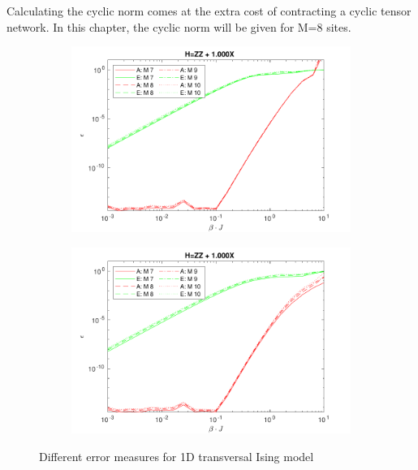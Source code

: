 Calculating the cyclic norm comes at the extra cost of contracting a cyclic tensor network. In this chapter, the cyclic norm will be given for M=8 sites.

\begin{figure}
    \begin{subfigure}[]{\linewidth}
        \includegraphics[width=\textwidth]{Figuren/benchmarking/comp_M_cycl.pdf}
    \end{subfigure}
    \begin{subfigure}[]{\linewidth}
        \includegraphics[width=\textwidth]{Figuren/benchmarking/Comp_M_lin.pdf}
    \end{subfigure}
    \caption{ Different error measures for 1D transversal Ising model }
    \label{benchmarking:systemsize}
\end{figure}

